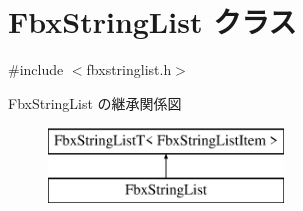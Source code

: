 \hypertarget{class_fbx_string_list}{}\section{Fbx\+String\+List クラス}
\label{class_fbx_string_list}


{\ttfamily \#include $<$fbxstringlist.\+h$>$}

Fbx\+String\+List の継承関係図\begin{figure}[H]
\begin{center}
\leavevmode
\includegraphics[height=2.000000cm]{class_fbx_string_list}
\end{center}
\end{figure}
